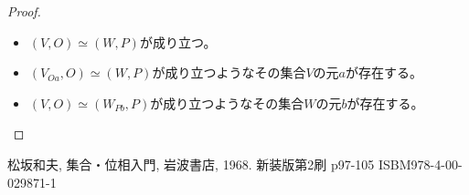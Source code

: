 \documentclass[dvipdfmx]{jsarticle}
\begin{document}
\begin{proof}
\begin{itemize}
\item
  $(V,O) \simeq (W,P)$が成り立つ。
\item
  $\left( V_{Oa},O \right) \simeq (W,P)$が成り立つようなその集合$V$の元$a$が存在する。
\item
  $(V,O) \simeq \left( W_{Pb},P \right)$が成り立つようなその集合$W$の元$b$が存在する。
\end{itemize}
\end{proof}
\begin{thebibliography}{50}
    松坂和夫, 集合・位相入門, 岩波書店, 1968. 新装版第2刷 p97-105 ISBM978-4-00-029871-1
\end{thebibliography}
\end{document}

